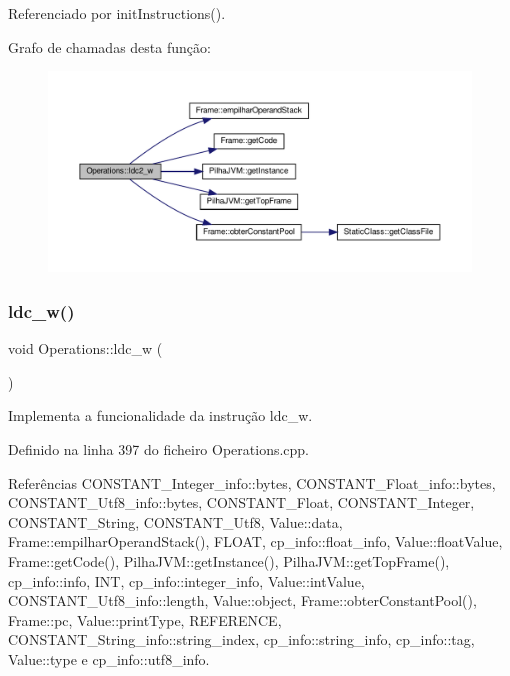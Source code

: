 Referenciado por init\+Instructions().

Grafo de chamadas desta função\+:\nopagebreak
\begin{figure}[H]
\begin{center}
\leavevmode
\includegraphics[width=350pt]{classOperations_ae5f11d6a8ea22b30f316c47af914f05a_cgraph}
\end{center}
\end{figure}
\mbox{\label{classOperations_a081fd22827f77e8ce5219275256cc831}} 
\subsubsection{\texorpdfstring{ldc\+\_\+w()}{ldc\_w()}}
{\footnotesize\ttfamily void Operations\+::ldc\+\_\+w (\begin{DoxyParamCaption}{ }\end{DoxyParamCaption})\hspace{0.3cm}{\ttfamily [private]}}



Implementa a funcionalidade da instrução ldc\+\_\+w. 



Definido na linha 397 do ficheiro Operations.\+cpp.



Referências C\+O\+N\+S\+T\+A\+N\+T\+\_\+\+Integer\+\_\+info\+::bytes, C\+O\+N\+S\+T\+A\+N\+T\+\_\+\+Float\+\_\+info\+::bytes, C\+O\+N\+S\+T\+A\+N\+T\+\_\+\+Utf8\+\_\+info\+::bytes, C\+O\+N\+S\+T\+A\+N\+T\+\_\+\+Float, C\+O\+N\+S\+T\+A\+N\+T\+\_\+\+Integer, C\+O\+N\+S\+T\+A\+N\+T\+\_\+\+String, C\+O\+N\+S\+T\+A\+N\+T\+\_\+\+Utf8, Value\+::data, Frame\+::empilhar\+Operand\+Stack(), F\+L\+O\+AT, cp\+\_\+info\+::float\+\_\+info, Value\+::float\+Value, Frame\+::get\+Code(), Pilha\+J\+V\+M\+::get\+Instance(), Pilha\+J\+V\+M\+::get\+Top\+Frame(), cp\+\_\+info\+::info, I\+NT, cp\+\_\+info\+::integer\+\_\+info, Value\+::int\+Value, C\+O\+N\+S\+T\+A\+N\+T\+\_\+\+Utf8\+\_\+info\+::length, Value\+::object, Frame\+::obter\+Constant\+Pool(), Frame\+::pc, Value\+::print\+Type, R\+E\+F\+E\+R\+E\+N\+CE, C\+O\+N\+S\+T\+A\+N\+T\+\_\+\+String\+\_\+info\+::string\+\_\+index, cp\+\_\+info\+::string\+\_\+info, cp\+\_\+info\+::tag, Value\+::type e cp\+\_\+info\+::utf8\+\_\+info.



